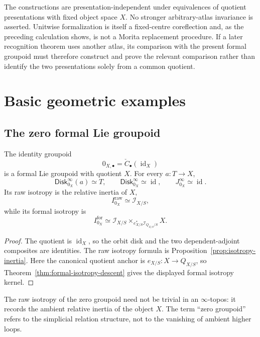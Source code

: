 \begin{remark}
The constructions are presentation-independent under equivalences of quotient
presentations with fixed object space $X$.  No stronger arbitrary-atlas
invariance is asserted.  Unitwise formalization is itself a fixed-centre
coreflection and, as the preceding calculation shows, is not a Morita
replacement procedure.  If a later recognition theorem uses another atlas,
its comparison with the present formal groupoid must therefore construct and
prove the relevant comparison rather than identify the two presentations
solely from a common quotient.
\end{remark}


\section{Basic geometric examples}
\label{sec:flg-examples}

\subsection{The zero formal Lie groupoid}

\begin{example}
The identity groupoid
\[
    0_{X,\bullet}
    =
    \check C_\bullet(\operatorname{id}_X)
\]
is a formal Lie groupoid with quotient $X$.  For every $a:T\to X$,
\[
    \mathsf{Disk}^{\infty}_{0_X}(a)\simeq T,
    \qquad
    \mathsf{Disk}^{\infty}_{0_X}\simeq\operatorname{id},
    \qquad
    J^\infty_{0_X}\simeq\operatorname{id}.
\]
Its raw isotropy is the relative inertia of $X$,
\[
    I^{\mathrm{raw}}_{0_X}
    \simeq
    \mathcal I_{X/S},
\]
while its formal isotropy is
\[
    I^{\mathrm{for}}_{0_X}
    \simeq
    \mathcal I_{X/S}
    \times_{e_{X/S}^*\mathcal I_{Q_{X/S}/S}}
    X.
\]
\end{example}

\begin{proof}
The quotient is $\operatorname{id}_X$, so the orbit disk and the two
dependent-adjoint composites are identities.  The raw isotropy formula is
Proposition~\ref{prop:isotropy-inertia}.  Here the canonical quotient anchor is
$e_{X/S}:X\to Q_{X/S}$, so
Theorem~\ref{thm:formal-isotropy-descent} gives the displayed formal
isotropy kernel.
\end{proof}

\begin{remark}
The raw isotropy of the zero groupoid need not be trivial in an
$\infty$-topos: it records the ambient relative inertia of the object $X$.
The term ``zero groupoid'' refers to the simplicial relation structure, not
to the vanishing of ambient higher loops.
\end{remark}


